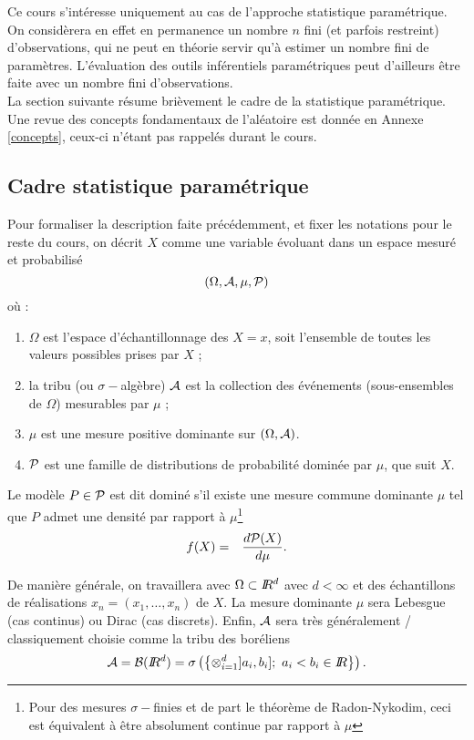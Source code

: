 Ce cours s'intéresse uniquement au cas de l'approche statistique paramétrique. On considèrera en effet en permanence un nombre $n$ fini (et parfois restreint) d'observations, qui ne peut en théorie servir qu'à estimer un nombre fini de paramètres. L'évaluation des outils inférentiels paramétriques peut d'ailleurs \^etre faite avec un nombre fini d'observations. \\

La section suivante résume brièvement le cadre de la statistique paramétrique. Une revue des concepts fondamentaux de l'aléatoire est donnée en Annexe \ref{concepts}, ceux-ci n'étant pas rappelés durant le cours.  

\subsection{Cadre statistique paramétrique}

Pour formaliser la description faite précédemment, et fixer les notations pour le reste du cours, on décrit $X$ comme une variable évoluant dans un {espace mesuré et probabilisé}
$$
(\Omega,{\cal{A}},\mu,{\cal{P}})
$$ 
où :
\begin{enumerate}
\item $\Omega$ est l'{espace d'échantillonnage} des $X=x$, soit l'ensemble de toutes les valeurs possibles prises par $X$ ;
\item la {tribu} (ou $\sigma-$algèbre) ${\cal{A}}$ est la  collection des événements (sous-ensembles de $\Omega$) mesurables par $\mu$  ;
\item  $\mu$ est une {mesure positive dominante} sur $(\Omega,{\cal{A}})$.
\item ${\cal{P}}$ est une famille de {distributions de probabilité} dominée par $\mu$, que suit $X$.
\end{enumerate}

\begin{definition}[Domination]
 Le modèle $P\in{\cal{P}}$ est dit dominé s'il existe une mesure commune dominante $\mu$ tel que $P$ admet une densité par rapport à $\mu$\footnote{Pour des mesures  $\sigma-$finies et de part le théorème de Radon-Nykodim, ceci est équivalent à être absolument continue par rapport à $\mu$}
 \begin{eqnarray*}
 f(X) & = & \frac{d {\cal{P}}(X)}{d\mu}.
 \end{eqnarray*}
\end{definition}

De manière générale, on travaillera avec $\Omega\subset I\!\!R^d$ avec $d<\infty$ et des échantillons de réalisations ${ x_n}=(x_1,\ldots,x_n)$ de $X$. La mesure dominante $\mu$ sera Lebesgue (cas continus) ou Dirac (cas discrets). Enfin, ${\cal{A}}$ sera très généralement / classiquement choisie comme la tribu des boréliens 
$${\cal{A}}={\cal{B}}(I\!\!R^d)=\sigma\left(
\left\{\otimes_{i=1}^d ]a_i,b_i]; \  a_i<b_i\in I\!\!R\right\}\right).$$

